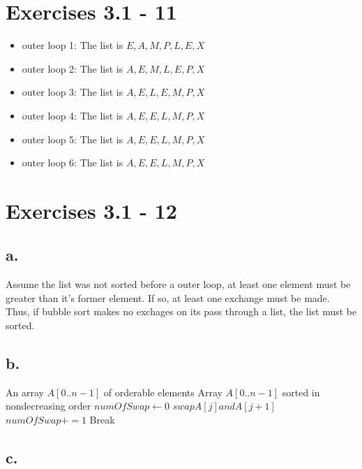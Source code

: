 \documentclass{article}
\begin{document}
\section{Exercises 3.1 - 11}

\begin{itemize}
\item outer loop 1: The list is $E,A,M,P,L,E,X$
\item outer loop 2: The list is $A,E,M,L,E,P,X$
\item outer loop 3: The list is $A,E,L,E,M,P,X$
\item outer loop 4: The list is $A,E,E,L,M,P,X$
\item outer loop 5: The list is $A,E,E,L,M,P,X$
\item outer loop 6: The list is $A,E,E,L,M,P,X$
\end{itemize}

\section{Exercises 3.1 - 12}

\subsection{a.}

Assume the list was not sorted before a outer loop, at least one element must be greater than it's former element. If so, at least one exchange must be made. Thus, if bubble sort makes no exchages on its pass through a list, the list must be sorted.

\subsection{b.}

\begin{center}
\begin{algorithmic}
\INPUT
An array $A[0..n-1]$ of orderable elements
\OUTPUT
Array $A[0..n-1]$ sorted in nondecreasing order
\State $numOfSwap \leftarrow 0$
\State $swap A[j] and A[j+1]$
\State $numOfSwap += 1$
\EndIf
\EndFor
{}
\State Break
\EndIf
\EndFor
\end{algorithmic}
\end{center}

\subsection{c.}
\end{document}
